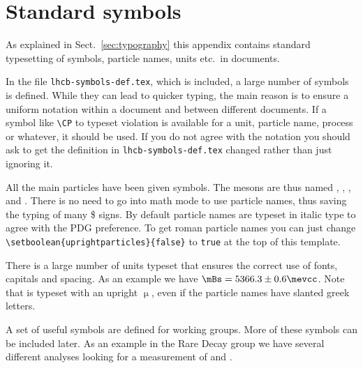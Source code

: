 \section{Standard symbols}

As explained in Sect.~\ref{sec:typography} this appendix contains standard
typesetting of symbols, particle names, units etc.\ in \lhcb
documents. 

In the file \texttt{lhcb-symbols-def.tex}, which is included, a
large number of symbols is defined. While they can lead to quicker
typing, the main reason is to ensure a uniform notation within a
document and between different \lhcb documents. If a symbol
like \texttt{\textbackslash CP} to typeset \CP violation is available
for a unit, particle name, process or whatever, it should be used.  If
you do not agree with the notation you should ask to get the
definition in \texttt{lhcb-symbols-def.tex} changed rather than just
ignoring it.

All the main particles have been given symbols. The \B mesons are thus
named \Bp, \Bd, \Bs, and \Bc. There is no need to go into math mode to
use particle names, thus saving the typing of many \$ signs. By
default particle names are typeset in italic type to agree with the
PDG preference. To get roman particle
names you can just change 
\texttt{\textbackslash setboolean\{uprightparticles\}\{false\}}
to \texttt{true} at the top of this template.

There is a large number of units typeset that ensures the correct use
of fonts, capitals and spacing. As an example we have
$\mBs=5366.3\pm0.6\mevcc$. Note that \mum is typeset with an upright
$\upmu$, even if the particle names have slanted greek letters.

A set of useful symbols are defined for working groups. More of these
symbols can be included later. As an example in the Rare Decay group
we have several different analyses looking for a measurement of
 and .



